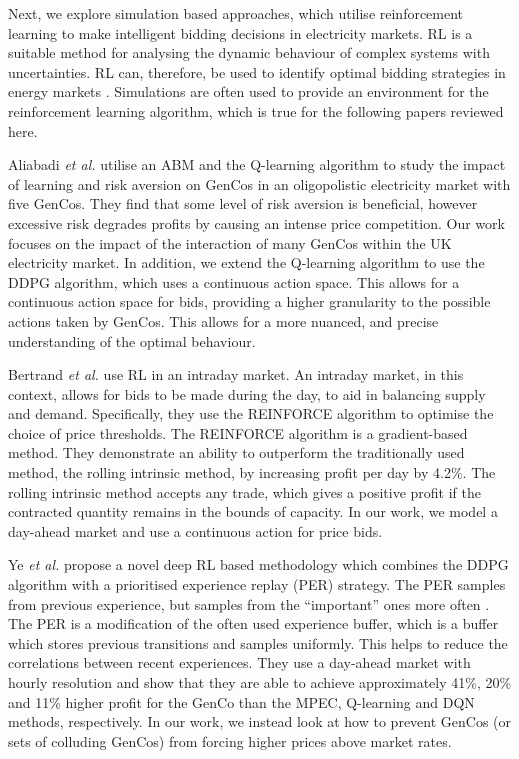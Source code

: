 Next, we explore simulation based approaches, which utilise reinforcement learning to make intelligent bidding decisions in electricity markets. RL is a suitable method for analysing the dynamic behaviour of complex systems with uncertainties. RL can, therefore, be used to identify optimal bidding strategies in energy markets \cite{Yang2020}. Simulations are often used to provide an environment for the reinforcement learning algorithm, which is true for the following papers reviewed here.


Aliabadi \textit{et al.} \cite{EsmaeiliAliabadi2017} utilise an ABM and the Q-learning algorithm to study the impact of learning and risk aversion on GenCos in an oligopolistic electricity market with five GenCos. They find that some level of risk aversion is beneficial, however excessive risk degrades profits by causing an intense price competition. Our work focuses on the impact of the interaction of many GenCos within the UK electricity market. In addition, we extend the Q-learning algorithm to use the DDPG algorithm, which uses a continuous action space. This allows for a continuous action space for bids, providing a higher granularity to the possible actions taken by GenCos. This allows for a more nuanced, and precise understanding of the optimal behaviour.

Bertrand \textit{et al.} \cite{Bertrand2019} use RL in an intraday market. An intraday market, in this context, allows for bids to be made during the day, to aid in balancing supply and demand. Specifically, they use the REINFORCE algorithm to optimise the choice of price thresholds. The REINFORCE algorithm is a gradient-based method. They demonstrate an ability to outperform the traditionally used method, the rolling intrinsic method, by increasing profit per day by 4.2\%. The rolling intrinsic method accepts any trade, which gives a positive profit if the contracted quantity remains in the bounds of capacity. In our work, we model a day-ahead market and use a continuous action for price bids.

Ye \textit{et al.} \cite{Ye2020a} propose a novel deep RL based methodology which combines the DDPG algorithm \cite{Hunt2016a} with a prioritised experience replay (PER) strategy\cite{schaul2015prioritized}. The PER samples from previous experience, but samples from the ``important'' ones more often \cite{Schaul2016}. The PER is a modification of the often used experience buffer, which is a buffer which stores previous transitions and samples uniformly. This helps to reduce the correlations between recent experiences. They use a day-ahead market with hourly resolution and show that they are able to achieve approximately 41\%, 20\% and 11\% higher profit for the GenCo than the MPEC, Q-learning and DQN methods, respectively. In our work, we instead look at how to prevent GenCos (or sets of colluding GenCos) from forcing higher prices above market rates.



